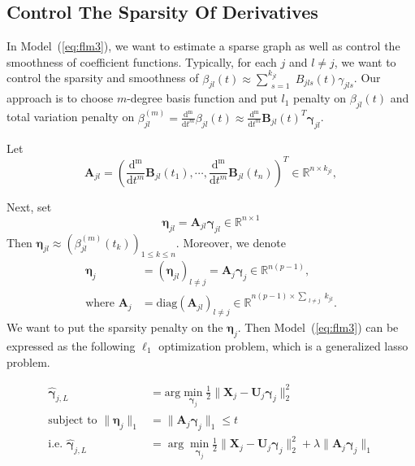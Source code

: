 \documentclass[11pt]{article}
\newcommand{\R}{\mathbb R}
\newcommand{\bX}{\mathbf X}
\newcommand{\bA}{\mathbf A}
\newcommand{\bB}{\mathbf B}
\newcommand{\bU}{\mathbf U}
\newcommand{\bseta}{\boldsymbol{\eta}}
\newcommand{\bgamma}{\boldsymbol{\gamma}}
\begin{document}
\subsection{Control The Sparsity Of Derivatives}

In Model~(\ref{eq:flm3}), we want to estimate a sparse graph as well as control the smoothness of coefficient functions. Typically, for each $j$ and $l \neq j$, we want to control the sparsity and smoothness of $\beta_{jl}(t) \approx \sum_{\substack{s=1}}^{k_{jl}} B_{jls}(t) \gamma_{jls}$. Our approach is to choose $m$-degree basis function and put $l_1$ penalty on $\beta_{jl}(t)$ and total variation penalty on $\beta_{jl}^{(m)} = \frac{\mathrm{d^m}}{\mathrm{d} t^m} \beta_{jl}(t) \approx \frac{\mathrm{d^m}}{\mathrm{d} t^m} \bB_{jl}(t)^T \bgamma_{jl}$.


Let 
\begin{equation}
	\bA_{jl} = \left( \frac{\mathrm{d^m}}{\mathrm{d} t^m} \bB_{jl}(t_1), \cdots, \frac{\mathrm{d^m}}{\mathrm{d} t^m} \bB_{jl}(t_n) \right)^T \in \R^{n \times k_{jl}},
\end{equation} 

Next, set
\begin{equation}
	\bseta_{jl} = \bA_{jl} \bgamma_{jl} \in \R^{n \times 1}  
\end{equation}
Then $\bseta_{jl} \approx (\beta_{jl}^{(m)}(t_k))_{1 \leq k \leq n}$. Moreover, we denote 
\begin{equation}
	\begin{aligned}
	\bseta_j &= (\bseta_{jl})_{l \neq j} = \bA_j \bgamma_j \in \R^{n(p-1)},\\
    \text{where }\bA_j&= \text{diag}(\bA_{jl})_{l \neq j} \in \R^{n(p-1)  \times \sum_{\substack{l \neq j}} k_{jl} }.
	\end{aligned}
\end{equation}
We want to put the sparsity penalty on the $\bseta_j$. Then Model~(\ref{eq:flm3}) can be expressed as the following $\ell_1$ optimization problem, which is a generalized lasso problem. 
   
\begin{equation}
    \label{eq:glars}
    \begin{aligned}
    \hat{\bgamma}_{j,L} &= \text{arg} \min_{\substack{\bgamma_j}} \frac{1}{2}\|\bX_j - \bU_j \bgamma_j\|_2^2 \\
    \text{subject to } \|\bseta_j\|_1 &= \|\bA_j \bgamma_j\|_1 \leq t\\
    \text{i.e. }\hat{\bgamma}_{j,L} &= \arg\min_{\substack{\bgamma_j}} \frac{1}{2}\|\bX_j - \bU_j \bgamma_j\|_2^2 + \lambda \|\bA_j \bgamma_j\|_1\\
    \end{aligned}
\end{equation}
\end{document}
